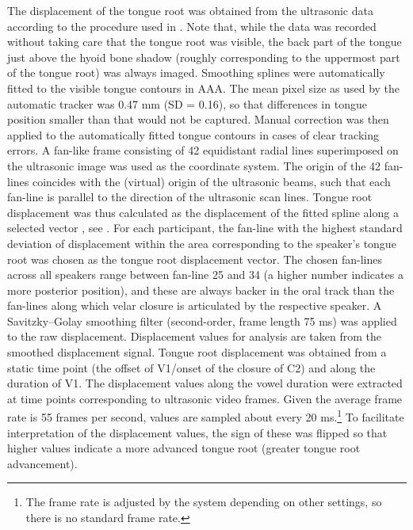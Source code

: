 \documentclass[preprint]{JASAnew}
\begin{document}
The displacement of the tongue root was obtained from the ultrasonic
data according to the procedure used in \citet{kirkham2017}. Note that,
while the data was recorded without taking care that the tongue root was
visible, the back part of the tongue just above the hyoid bone shadow
(roughly corresponding to the uppermost part of the tongue root) was
always imaged. Smoothing splines were automatically fitted to the
visible tongue contours in AAA. The mean pixel size as used by the
automatic tracker was 0.47 mm (SD = 0.16), so that differences in tongue
position smaller than that would not be captured. Manual correction was
then applied to the automatically fitted tongue contours in cases of
clear tracking errors. A fan-like frame consisting of 42 equidistant
radial lines superimposed on the ultrasonic image was used as the
coordinate system. The origin of the 42 fan-lines coincides with the
(virtual) origin of the ultrasonic beams, such that each fan-line is
parallel to the direction of the ultrasonic scan lines. Tongue root
displacement was thus calculated as the displacement of the fitted
spline along a selected vector \citep{strycharczuk2015}, see
. For each participant, the fan-line with the highest
standard deviation of displacement within the area corresponding to the
speaker's tongue root was chosen as the tongue root displacement vector.
The chosen fan-lines across all speakers range between fan-line 25 and
34 (a higher number indicates a more posterior position), and these are
always backer in the oral track than the fan-lines along which velar
closure is articulated by the respective speaker. A Savitzky--Golay
smoothing filter (second-order, frame length 75 ms) was applied to the
raw displacement. Displacement values for analysis are taken from the
smoothed displacement signal. Tongue root displacement was obtained from
a static time point (the offset of V1/onset of the closure of C2) and
along the duration of V1. The displacement values along the vowel
duration were extracted at time points corresponding to ultrasonic video
frames. Given the average frame rate is 55 frames per second, values are
sampled about every 20
ms.\footnote{The frame rate is adjusted by the system depending on other settings, so there is no standard frame rate.}
To facilitate interpretation of the displacement values, the sign of
these was flipped so that higher values indicate a more advanced tongue
root (greater tongue root advancement).
\end{document}
